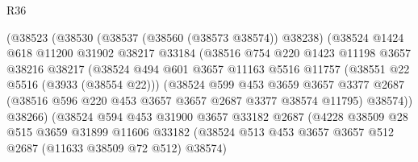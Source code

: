 \begin{lexlean}{R36}
\begin{coremodule}
                          (@38523
                            (@38530
                              (@38537 (@38560 (@38573 @38574)) @38238)
                              (@38524
                                @1424
                                @618
                                @11200
                                @31902
                                @38217
                                @33184
                                (@38516
                                  @754
                                  @220
                                  @1423
                                  @11198
                                  @3657
                                  @38216
                                  @38217
                                  (@38524
                                    @494
                                    @601
                                    @3657
                                    @11163
                                    @5516
                                    @11757
                                    (@38551 @22 @5516 (@3933 (@38554 @22)))
                                    (@38524
                                      @599
                                      @453
                                      @3659
                                      @3657
                                      @3377
                                      @2687
                                      (@38516 @596 @220 @453 @3657 @3657 @2687 @3377 @38574 @11795)
                                      @38574))
                                  @38266)
                                (@38524
                                  @594
                                  @453
                                  @31900
                                  @3657
                                  @33182
                                  @2687
                                  (@4228
                                    @38509
                                    @28
                                    @515
                                    @3659
                                    @31899
                                    @11606
                                    @33182
                                    (@38524
                                      @513
                                      @453
                                      @3657
                                      @3657
                                      @512
                                      @2687
                                      (@11633 @38509 @72 @512)
                                      @38574)

\end{coremodule}
\end{lexlean}
